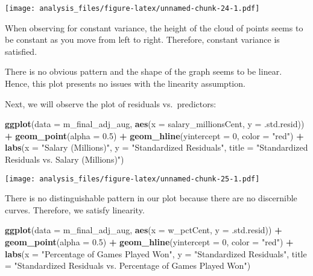 \documentclass[]{article}
\newenvironment{Shaded}{\begin{snugshade}}{\end{snugshade}}
\newcommand{\DataTypeTok}[1]{\textcolor[rgb]{0.13,0.29,0.53}{#1}}
\newcommand{\DecValTok}[1]{\textcolor[rgb]{0.00,0.00,0.81}{#1}}
\newcommand{\FloatTok}[1]{\textcolor[rgb]{0.00,0.00,0.81}{#1}}
\newcommand{\KeywordTok}[1]{\textcolor[rgb]{0.13,0.29,0.53}{\textbf{#1}}}
\newcommand{\NormalTok}[1]{#1}
\newcommand{\OperatorTok}[1]{\textcolor[rgb]{0.81,0.36,0.00}{\textbf{#1}}}
\newcommand{\StringTok}[1]{\textcolor[rgb]{0.31,0.60,0.02}{#1}}
\begin{document}
\texttt{[image: analysis\_files/figure-latex/unnamed-chunk-24-1.pdf]}

When observing for constant variance, the height of the cloud of points
seems to be constant as you move from left to right. Therefore, constant
variance is satisfied.

There is no obvious pattern and the shape of the graph seems to be
linear. Hence, this plot presents no issues with the linearity
assumption.

Next, we will observe the plot of residuals vs.~predictors:

\begin{Shaded}
\begin{Highlighting}[]
\KeywordTok{ggplot}\NormalTok{(}\DataTypeTok{data =}\NormalTok{ m_final_adj_aug, }\KeywordTok{aes}\NormalTok{(}\DataTypeTok{x =}\NormalTok{ salary_millionsCent, }\DataTypeTok{y =}\NormalTok{ .std.resid)) }\OperatorTok{+}
\StringTok{  }\KeywordTok{geom_point}\NormalTok{(}\DataTypeTok{alpha =} \FloatTok{0.5}\NormalTok{) }\OperatorTok{+}\StringTok{ }
\StringTok{  }\KeywordTok{geom_hline}\NormalTok{(}\DataTypeTok{yintercept =} \DecValTok{0}\NormalTok{, }\DataTypeTok{color =} \StringTok{"red"}\NormalTok{) }\OperatorTok{+}
\StringTok{  }\KeywordTok{labs}\NormalTok{(}\DataTypeTok{x =} \StringTok{"Salary (Millions)"}\NormalTok{, }\DataTypeTok{y =} \StringTok{"Standardized Residuals"}\NormalTok{, }
       \DataTypeTok{title =} \StringTok{"Standardized Residuals vs. Salary (Millions)"}\NormalTok{)}
\end{Highlighting}
\end{Shaded}

\texttt{[image: analysis\_files/figure-latex/unnamed-chunk-25-1.pdf]}

There is no distinguishable pattern in our plot because there are no
discernible curves. Therefore, we satisfy linearity.

\begin{Shaded}
\begin{Highlighting}[]
\KeywordTok{ggplot}\NormalTok{(}\DataTypeTok{data =}\NormalTok{ m_final_adj_aug, }\KeywordTok{aes}\NormalTok{(}\DataTypeTok{x =}\NormalTok{ w_pctCent, }\DataTypeTok{y =}\NormalTok{ .std.resid)) }\OperatorTok{+}
\StringTok{  }\KeywordTok{geom_point}\NormalTok{(}\DataTypeTok{alpha =} \FloatTok{0.5}\NormalTok{) }\OperatorTok{+}\StringTok{ }
\StringTok{  }\KeywordTok{geom_hline}\NormalTok{(}\DataTypeTok{yintercept =} \DecValTok{0}\NormalTok{, }\DataTypeTok{color =} \StringTok{"red"}\NormalTok{) }\OperatorTok{+}
\StringTok{  }\KeywordTok{labs}\NormalTok{(}\DataTypeTok{x =} \StringTok{"Percentage of Games Played Won"}\NormalTok{, }\DataTypeTok{y =} \StringTok{"Standardized Residuals"}\NormalTok{, }
       \DataTypeTok{title =} \StringTok{"Standardized Residuals vs. Percentage of Games Played Won"}\NormalTok{)}
\end{Highlighting}
\end{Shaded}
\end{document}
